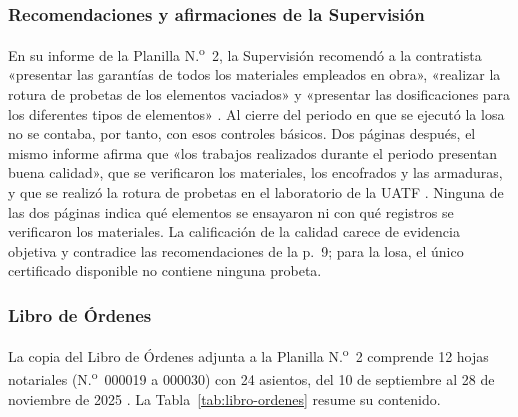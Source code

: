 \subsubsection{Recomendaciones y afirmaciones de la Supervisión}
En su informe de la Planilla N.\textsuperscript{o}~2, la Supervisión recomendó a la contratista «presentar las garantías de todos los materiales empleados en obra», «realizar la rotura de probetas de los elementos vaciados» y «presentar las dosificaciones para los diferentes tipos de elementos» \parencite[p.~9]{uatf2025pao2}. Al cierre del periodo en que se ejecutó la losa no se contaba, por tanto, con esos controles básicos. Dos páginas después, el mismo informe afirma que «los trabajos realizados durante el periodo presentan buena calidad», que se verificaron los materiales, los encofrados y las armaduras, y que se realizó la rotura de probetas en el laboratorio de la UATF \parencite[p.~11]{uatf2025pao2}. Ninguna de las dos páginas indica qué elementos se ensayaron ni con qué registros se verificaron los materiales. La calificación de la calidad carece de evidencia objetiva y contradice las recomendaciones de la p.~9; para la losa, el único certificado disponible no contiene ninguna probeta.

\subsubsection{Libro de Órdenes}
La copia del Libro de Órdenes adjunta a la Planilla N.\textsuperscript{o}~2 comprende 12 hojas notariales (N.\textsuperscript{o}~000019 a 000030) con 24 asientos, del 10 de septiembre al 28 de noviembre de 2025 \parencite[pp.~114--125]{uatf2025pao2}. La Tabla~\ref{tab:libro-ordenes} resume su contenido.

